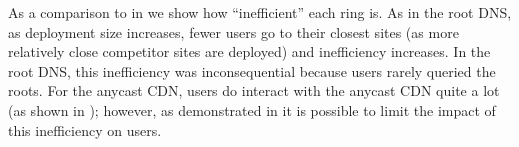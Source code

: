 \documentclass[sigconf,letterpaper,nonacm,10pt,anonymous]{acmart}
\begin{document}
As a comparison to  in
 we show how ``inefficient'' each ring
is. As in the root DNS, as deployment size increases, fewer users go to
their closest sites (as more relatively close competitor sites are
deployed) and inefficiency increases. In the root DNS, this inefficiency
was inconsequential because users rarely queried the roots. For the
anycast CDN, users do interact with the anycast CDN quite a lot (as
shown in ); however, as demonstrated in
 it is possible to
limit the impact of this inefficiency on users.

\iffalse
Don't remove this iffalse

\fi
\end{document}
